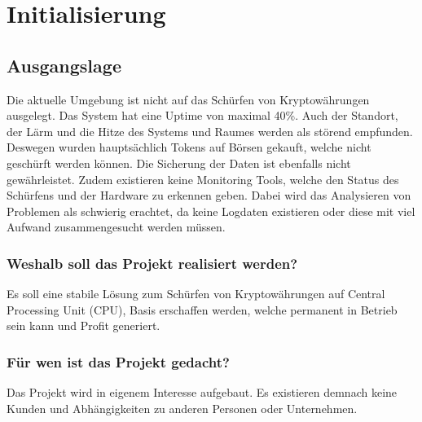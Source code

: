\section{Initialisierung}
\subsection{Ausgangslage}
Die aktuelle Umgebung ist nicht auf das Schürfen von Kryptowährungen ausgelegt. Das System hat eine Uptime von maximal 40\%. Auch der Standort, der Lärm und die Hitze des Systems und Raumes werden als störend empfunden. Deswegen wurden hauptsächlich Tokens auf Börsen gekauft, welche nicht geschürft werden können. Die Sicherung der Daten ist ebenfalls nicht gewährleistet. Zudem existieren keine Monitoring Tools, welche den Status des Schürfens und der Hardware zu erkennen geben. Dabei wird das Analysieren von Problemen als schwierig erachtet, da keine Logdaten existieren oder diese mit viel Aufwand zusammengesucht werden müssen. 

\subsubsection{Weshalb soll das Projekt realisiert werden?}
Es soll eine stabile Lösung zum Schürfen von Kryptowährungen auf Central Processing Unit (CPU), Basis erschaffen werden, welche permanent in Betrieb sein kann und Profit generiert.

\subsubsection{Für wen ist das Projekt gedacht?}
Das Projekt wird in eigenem Interesse aufgebaut. Es existieren demnach keine Kunden und Abhängigkeiten zu anderen Personen oder Unternehmen.

